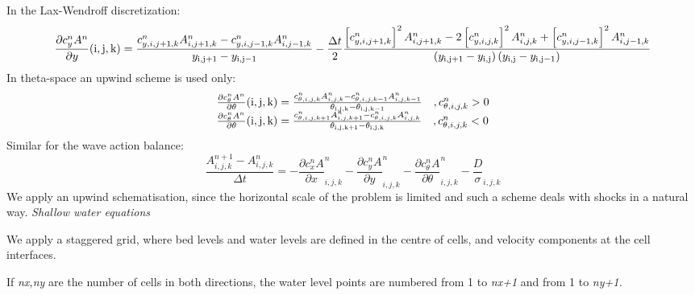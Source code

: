 In the Lax-Wendroff discretization:
\begin{equation} \label{4)} 
\frac{\partial c_{y}^{n} A^{n} }{\partial y} {\rm (i,j,k)}=\frac{c_{y,i,j+1,k}^{n} A_{i,j+1,k}^{n} -c_{y,i,j-1,k}^{n} A_{i,j-1,k}^{n} }{y_{{\rm i,j+1}} -y_{{\rm i,j-1}} } -\frac{\Delta t}{2} \frac{\left[c_{y,i,j+1,k}^{n} \right]^{2} A_{i,j+1,k}^{n} -2\left[c_{y,i,j,k}^{n} \right]^{2} A_{i,j,k}^{n} +\left[c_{y,i,j-1,k}^{n} \right]^{2} A_{i,j-1,k}^{n} }{\left(y_{{\rm i,j+1}} -y_{{\rm i,j}} \right)\left(y_{{\rm i,j}} -y_{{\rm i,j-1}} \right)}  
\end{equation} 
In theta-space an upwind scheme is used only:
\begin{equation} \label{5)} 
\begin{array}{l} {\frac{\partial c_{\theta }^{n} A^{n} }{\partial \theta } {\rm (i,j,k)}=\frac{c_{\theta ,i,j,k}^{n} A_{i,j,k}^{n} -c_{\theta ,i,j,k-1}^{n} A_{i,j,k-1}^{n} }{\theta _{{\rm i,j,k}} -\theta _{{\rm i,j,k-1}} } \quad ,c_{\theta ,i,j,k}^{n} >0} \\ {\frac{\partial c_{\theta }^{n} A^{n} }{\partial \theta } {\rm (i,j,k)}=\frac{c_{\theta ,i,j,k+1}^{n} A_{i,j,k+1}^{n} -c_{\theta ,i,j,k}^{n} A_{i,j,k}^{n} }{\theta _{{\rm i,j,k+1}} -\theta _{{\rm i,j,k}} } \quad ,c_{\theta ,i,j,k}^{n} <0} \end{array} 
\end{equation} 
Similar for the wave action balance:
\begin{equation} \label{6)} 
\frac{A_{i,j,k}^{n+1} -A_{i,j,k}^{n} }{\Delta t} =-\frac{\partial c_{x}^{n} A}{\partial x} _{i,j,k}^{n} -\frac{\partial c_{y}^{n} A}{\partial y} _{i,j,k}^{n} -\frac{\partial c_{\theta }^{n} A}{\partial \theta } _{i,j,k}^{n} -\frac{D}{\sigma } _{i,j,k}  
\end{equation} 
We apply an upwind schematisation, since the horizontal scale of the problem is limited and such a scheme deals with shocks in a natural way.
{\it  Shallow water equations}

We apply a staggered grid, where bed levels and water levels are defined in the centre of cells, and velocity components at the cell interfaces. 

If \textit{nx,ny} are the number of cells in both directions, the water level points are numbered from 1 to \textit{nx+1} and from 1 to \textit{ny+1.} 

